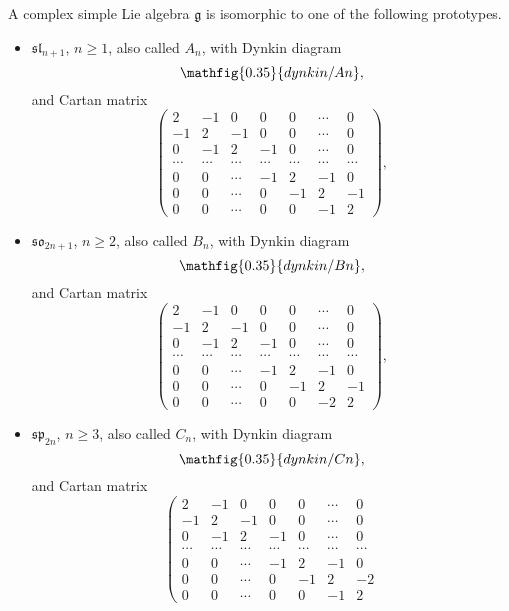 A complex simple Lie algebra
$\mathfrak{g}$ is isomorphic to one of the following prototypes.
\begin{itemize}
\item $\mathfrak{sl}_{n+1}$, $n \geq 1$, also called $A_n$, with Dynkin diagram
$$\mathfig{0.35}{dynkin/An},$$ and Cartan matrix $$\left(
\begin{array}{rrrrrrr}
 2 & -1 & 0 & 0 & 0 &\cdots & 0 \\
 -1 & 2 & -1 & 0 & 0 &\cdots & 0 \\
 0 & -1 & 2 & -1 & 0 & \cdots & 0 \\
 \cdots & \cdots & \cdots & \cdots & \cdots & \cdots & \cdots \\
 0 & 0& \cdots & -1 & 2 & -1 & 0 \\
 0 & 0 &\cdots & 0 & -1 & 2 & -1 \\
 0 & 0 &\cdots & 0 & 0 & -1 & 2
\end{array}
\right),$$
\item $\mathfrak{so}_{2n+1}$, $n \geq 2$, also called $B_n$, with Dynkin diagram
$$\mathfig{0.35}{dynkin/Bn},$$ and Cartan matrix
$$\left(
\begin{array}{rrrrrrr}
 2 & -1 & 0 & 0 & 0 & \cdots & 0 \\
 -1 & 2 & -1 & 0 & 0 & \cdots & 0 \\
 0 & -1 & 2 & -1 & 0 & \cdots &0 \\
 \cdots & \cdots & \cdots & \cdots & \cdots & \cdots & \cdots \\
 0 & 0 &\cdots & -1 & 2 & -1 & 0 \\
 0 & 0 &\cdots & 0 & -1 & 2 & -1 \\
 0 & 0 &\cdots & 0 & 0 & -2 & 2
\end{array}
\right),$$
\item $\mathfrak{sp}_{2n}$, $n \geq 3$, also called $C_n$, with Dynkin diagram
$$\mathfig{0.35}{dynkin/Cn},$$ and Cartan matrix $$\left(
\begin{array}{rrrrrrr}
 2 & -1 & 0 & 0 & 0 & \cdots & 0 \\
 -1 & 2 & -1 & 0 & 0 & \cdots & 0 \\
 0 & -1 & 2 & -1 & 0 & \cdots &0 \\
 \cdots & \cdots & \cdots & \cdots & \cdots & \cdots & \cdots \\
 0 & 0 &\cdots & -1 & 2 & -1 & 0 \\
 0 & 0 &\cdots & 0 & -1 & 2 & -2 \\
 0 & 0 &\cdots & 0 & 0 & -1 & 2
\end{array}
$$
\end{itemize}
